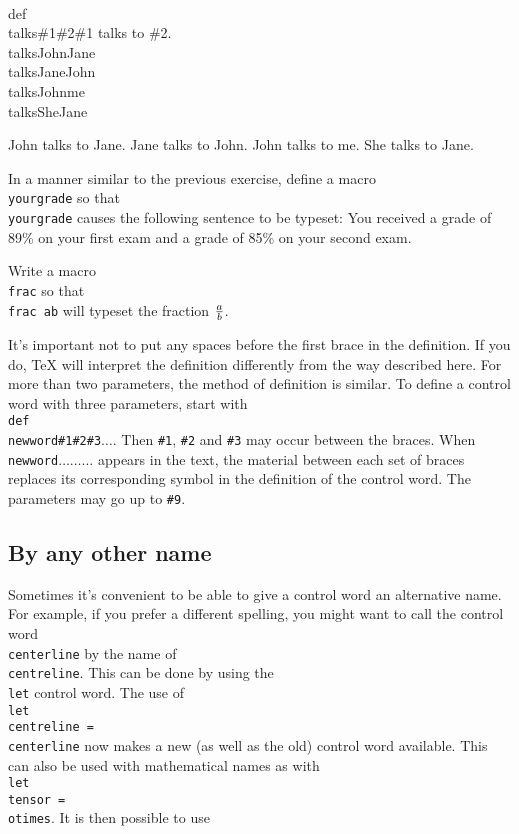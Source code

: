 \beginuser 
\\def\\talks\#1\#2\lb \#1 talks to \#2.\rb 
\\talks\lb John\rb\lb Jane\rb 
\\talks\lb Jane\rb\lb John\rb 
\\talks\lb John\rb\lb me\rb 
\\talks\lb She\rb\lb Jane\rb 
\enduser 
 
\def\talks#1#2{#1 talks to #2.} 
\talks{John}{Jane} 
\talks{Jane}{John} 
\talks{John}{me} 
\talks{She}{Jane} 
 
\exercise In a manner similar to the previous exercise, define a 
macro {\tt \\yourgrade} so that {\tt \\yourgrade{}\rb{}\rb} 
causes the following sentence to be typeset: You received a grade 
of 89\% on your first exam and a grade of 85\% on your second 
exam. 
 
\exercise Write a macro {\tt \\frac} so that {\tt \\frac\lb 
a\rb\lb b\rb} will typeset the fraction ${a\over b}$. 
 
\bigskip 
It's important not to put any spaces before the first brace in 
the definition. If you do, \TeX{} will interpret the definition 
differently from the way described here. For more than two 
parameters, the method of definition is similar. To define a 
control word with three parameters, start with 
{\tt \\def\\newword\#1\#2\#3\lb$\ldots$\rb}. Then {\tt \#1}, 
{\tt \#2} and {\tt \#3} may occur between the braces. When 
{\tt \\newword\lb$\ldots$\rb\lb$\ldots$\rb\lb$\ldots$\rb} 
appears in the text, the material between each set of braces 
replaces its corresponding symbol in the definition of the 
control word. The parameters may go up to {\tt \#9}. 
 
\subsection{By any other name} 
 
Sometimes it's convenient to be able to give a control word an 
alternative name.  For example, if you prefer a different spelling, 
you might want to call the control word {\tt \\centerline} by the 
name of {\tt \\centreline}.  This can be done by using the {\tt 
\\let} control word.  The use of {\tt \\let \\centreline = 
\\centerline} now makes a new (as well as the old) control word 
available.  This can also be used with mathematical names as with 
{\tt \\let \\tensor = \\otimes}.  It is then possible to use 
 

